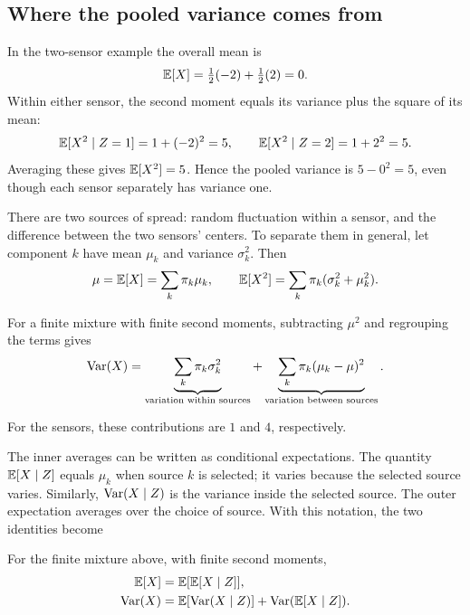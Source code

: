 \subsection{Where the pooled variance comes from}

In the two-sensor example the overall mean is
\[
  \mathbb{E}[X]=\tfrac12(-2)+\tfrac12(2)=0.
\]
Within either sensor, the second moment equals its variance plus the
square of its mean:
\[
  \mathbb{E}[X^2\mid Z=1]=1+(-2)^2=5,\qquad
  \mathbb{E}[X^2\mid Z=2]=1+2^2=5.
\]
Averaging these gives \(\mathbb{E}[X^2]=5\). Hence the pooled variance is
\(5-0^2=5\), even though each sensor separately has variance one.

There are two sources of spread: random fluctuation within a sensor,
and the difference between the two sensors' centers. To separate them
in general, let component \(k\) have mean \(\mu_k\) and variance
\(\sigma_k^2\). Then
\[
  \mu=\mathbb{E}[X]=\sum_k\pi_k\mu_k,\qquad
  \mathbb{E}[X^2]=\sum_k\pi_k(\sigma_k^2+\mu_k^2).
\]
\begin{result}
For a finite mixture with finite second moments, subtracting \(\mu^2\)
and regrouping the terms gives
\begin{equation}
  \operatorname{Var}(X)
  =\underbrace{\sum_k\pi_k\sigma_k^2}_{\text{variation within sources}}
   +\underbrace{\sum_k\pi_k(\mu_k-\mu)^2}_{\text{variation between sources}}.
  \label{eq:mixture-variance}
\end{equation}
\end{result}
For the sensors, these contributions are \(1\) and \(4\), respectively.

The inner averages can be written as conditional expectations.
The quantity \(\mathbb{E}[X\mid Z]\) equals \(\mu_k\) when source \(k\) is
selected; it varies because the selected source varies.
Similarly, \(\operatorname{Var}(X\mid Z)\) is the variance inside the selected source.
The outer expectation averages over the choice of source. With this
notation, the two identities become
\begin{theorem}
For the finite mixture above, with finite second moments,
\begin{align}
  \mathbb{E}[X]&=\mathbb{E}[\mathbb{E}[X\mid Z]],\label{eq:total-expectation}\\
  \operatorname{Var}(X)&=\mathbb{E}[\operatorname{Var}(X\mid Z)]
       +\operatorname{Var}(\mathbb{E}[X\mid Z]).\label{eq:total-variance}
\end{align}
\end{theorem}

